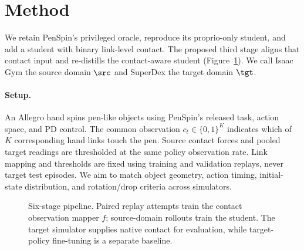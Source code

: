 \section{Method}

We retain PenSpin's privileged oracle, reproduce its proprio-only student, and add a student with binary link-level contact. The proposed third stage aligns that contact input and re-distills the contact-aware student (Figure~\ref{fig:pipeline}). We call Isaac Gym the source domain $\src$ and SuperDex the target domain $\tgt$.

\paragraph{Setup.}
An Allegro hand spins pen-like objects using PenSpin's released task, action space, and PD control. The common observation $c_t\in\{0,1\}^{K}$ indicates which of $K$ corresponding hand links touch the pen. Source contact forces and pooled target readings are thresholded at the same policy observation rate. Link mapping and thresholds are fixed using training and validation replays, never target test episodes. We aim to match object geometry, action timing, initial-state distribution, and rotation/drop criteria across simulators.

\begin{figure}[htbp]
\centering

\caption{Six-stage pipeline. Paired replay attempts train the contact observation mapper $f$; source-domain rollouts train the student. The target simulator supplies native contact for evaluation, while target-policy fine-tuning is a separate baseline.}
\label{fig:pipeline}
\end{figure}

